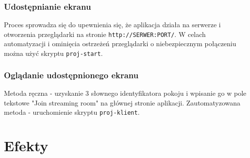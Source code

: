 \documentclass[a4paper,11pt]{article}
\begin{document}
            \subsubsection{Udostępnianie ekranu}
            Proces sprowadza się do upewnienia się, że aplikacja działa na serwerze i otworzenia przeglądarki na stronie \texttt{http://SERWER:PORT/}.
            W celach automatyzacji i ominięcia ostrzeżeń przeglądarki o niebezpiecznym połączeniu można użyć skryptu \texttt{proj-start}.
            \subsubsection{Oglądanie udostępnionego ekranu}
            Metoda ręczna - uzyskanie 3 słownego identyfikatora pokoju i wpisanie go w pole tekstowe "Join streaming room" na głównej stronie aplikacji.
            Zautomatyzowana metoda - uruchomienie skryptu \texttt{proj-klient}.
    \section{Efekty}
\end{document}
